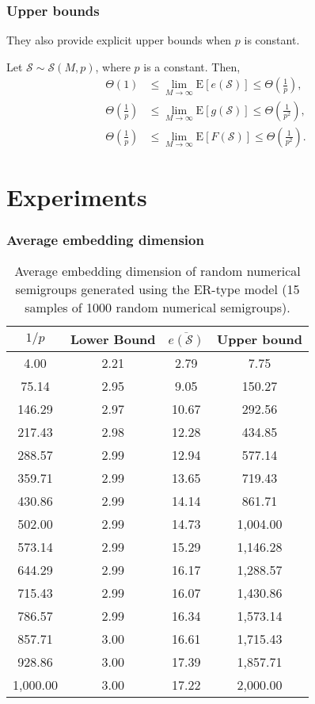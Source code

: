 \documentclass{beamer}
\def\EE{\ensuremath{\mathrm{E}}}
\begin{document}
\begin{frame}
    \frametitle{Upper bounds}
    They also provide explicit upper bounds when $p$ is constant.
    \begin{theorem}
        Let $\mathcal{S} \sim \mathcal{S}(M, p)$, where $p$ is a constant. Then, 
        \begin{align*}
            \Theta(1) &\leq \lim_{M \to \infty} \EE[e(\mathcal{S})] \leq \Theta\left(\frac{1}{p}\right), \\
            \Theta\left(\frac{1}{p}\right) &\leq \lim_{M \to \infty} \EE[g(\mathcal{S})] \leq \Theta\left(\frac{1}{p^2}\right),\\
            \Theta\left(\frac{1}{p}\right) &\leq \lim_{M \to \infty} \EE[F(\mathcal{S})] \leq \Theta\left(\frac{1}{p^2}\right).
        \end{align*}
    \end{theorem}
\end{frame}
    
\section{Experiments}


\begin{frame}
\fontsize{10pt}{7.2}\selectfont
\frametitle{Average embedding dimension}
\begin{table}
    \centering
    \begin{tabular}{|c|c|c|c|}
        \hline
        $1/p$ & Lower Bound & $\overline{e(\mathcal{S})}$  & Upper bound \\
        \hline
        4.00 & 2.21 & 2.79 & 7.75 \\
        75.14 & 2.95 & 9.05 & 150.27 \\
        146.29 & 2.97 & 10.67 & 292.56 \\
        217.43 & 2.98 & 12.28 & 434.85 \\
        288.57 & 2.99 & 12.94 & 577.14 \\
        359.71 & 2.99 & 13.65 & 719.43 \\
        430.86 & 2.99 & 14.14 & 861.71 \\
        502.00 & 2.99 & 14.73 & 1,004.00 \\
        573.14 & 2.99 & 15.29 & 1,146.28 \\
        644.29 & 2.99 & 16.17 & 1,288.57 \\
        715.43 & 2.99 & 16.07 & 1,430.86 \\
        786.57 & 2.99 & 16.34 & 1,573.14 \\
        857.71 & 3.00 & 16.61 & 1,715.43 \\
        928.86 & 3.00 & 17.39 & 1,857.71 \\
        1,000.00 & 3.00 & 17.22 & 2,000.00 \\
        \hline
    \end{tabular}
    \caption{Average embedding dimension of random numerical semigroups generated using the ER-type model (15 samples of 1000 random numerical semigroups).}
    \label{tab:embedding}
    \end{table}
\end{frame}
\end{document}
